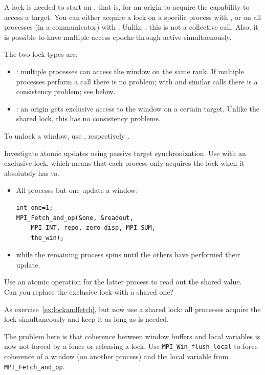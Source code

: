 A lock is needed to start an , that is,
for an origin to acquire the capability to access a target.
You can either acquire a lock on a specific process with ,
or on all processes (in a communicator) with .
Unlike , this is not a collective call.
Also, it is possible to have multiple access epochs through 
active simultaenously.

The two lock types are:
\begin{itemize}
\item {}: multiple processes can access 
  the window on the same rank.
  If multiple processes perform a  call there
  is no problem; with  and similar calls
  there is a consistency problem; see below.
\item {}: an origin gets exclusive access to the
  window on a certain target.
  Unlike the shared lock, this has no consistency problems.
\end{itemize}

To unlock a window, use
, %
respectively .

\begin{exercise}
  \label{ex:lockandfetch}
  Investigate atomic updates using passive target synchronization.
  Use  with an exclusive lock, which
  means that each process only acquires the lock when it absolutely has to.
  \begin{itemize}
  \item All processs but one update a window:
\begin{lstlisting}
int one=1;
MPI_Fetch_and_op(&one, &readout,
    MPI_INT, repo, zero_disp, MPI_SUM,
    the_win);
\end{lstlisting}
  \item while the remaining process spins until the others have performed their update.
  \end{itemize}
  Use an atomic operation for the latter process to read out the shared value.\\
  Can you replace the exclusive lock with a shared one?
\end{exercise}

\begin{exercise}
  \label{ex:lockfetchshared}
  As exercise~\ref{ex:lockandfetch}, but now use a shared lock:
  all processes acquire the lock simultaneously and keep it as long as is needed.

  The problem here is that coherence between window buffers and local variables is
  now not forced by a fence or releasing a lock. Use \lstinline{MPI_Win_flush_local} to
  force coherence of a window (on another process) and the local variable from
  \lstinline{MPI_Fetch_and_op}.
\end{exercise}

